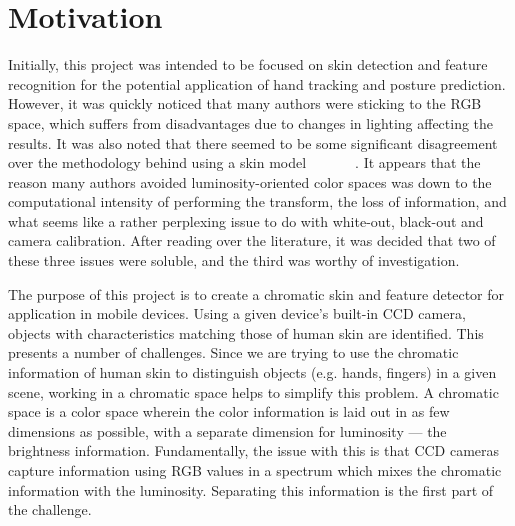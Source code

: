 
\chapter{Motivation}  %

\ifpdf
    \graphicspath{{Chapter1/Figs/Raster/}{Chapter2/Figs/PDF/}{Chapter2/Figs/}}
\else
    \graphicspath{{Chapter1/Figs/Vector/}{Chapter2/Figs/}}
\fi

Initially, this project was intended to be focused on skin detection and feature recognition for the potential application of hand tracking and posture prediction. However, it was quickly noticed that many authors were sticking to the RGB space, which suffers from disadvantages due to changes in lighting affecting the results. It was also noted that there seemed to be some significant disagreement over the methodology behind using a skin model~\cite{Shin2002a}~\cite{Sigal2000a}~\cite{Skarbek1994}~\cite{Soriano2000a}~\cite{Terrillon1999a}~\cite{Vezhnevets2003}~\cite{Brown2001a}. It appears that the reason many authors avoided luminosity-oriented color spaces was down to the computational intensity of performing the transform, the loss of information, and what seems like a rather perplexing issue to do with white-out, black-out and camera calibration. After reading over the literature, it was decided that two of these three issues were soluble, and the third was worthy of investigation.


The purpose of this project is to create a chromatic skin and feature detector for application in mobile devices. Using a given device's built-in CCD camera, objects with characteristics matching those of human skin are identified. This presents a number of challenges. Since we are trying to use the chromatic information of human skin to distinguish objects (e.g. hands, fingers) in a given scene, working in a chromatic space helps to simplify this problem. A chromatic space is a color space wherein the color information is laid out in as few dimensions as possible, with a separate dimension for luminosity --- the brightness information. Fundamentally, the issue with this is that CCD cameras capture information using RGB values in a spectrum which mixes the chromatic information with the luminosity. Separating this information is the first part of the challenge.

